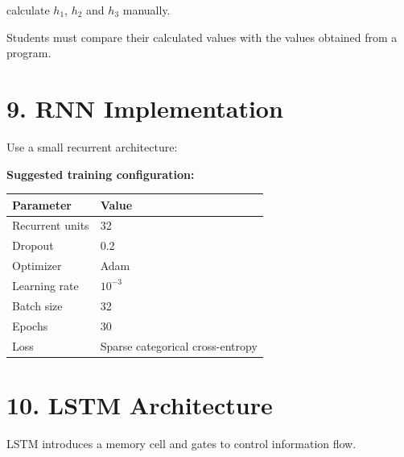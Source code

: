 \documentclass[10pt]{article}
\begin{document}
calculate $h_1$, $h_2$ and $h_3$ manually.

Students must compare their calculated values with the values obtained from
a program.

\section*{9. RNN Implementation}

Use a small recurrent architecture:

\begin{center}
\end{center}

\textbf{Suggested training configuration:}

\begin{center}
\begin{tabular}{|l|l|}
\hline
Parameter & Value\\
\hline
Recurrent units & 32\\
Dropout & 0.2\\
Optimizer & Adam\\
Learning rate & $10^{-3}$\\
Batch size & 32\\
Epochs & 30\\
Loss & Sparse categorical cross-entropy\\
\hline
\end{tabular}
\end{center}

\section*{10. LSTM Architecture}

LSTM introduces a memory cell and gates to control information flow.
\end{document}
